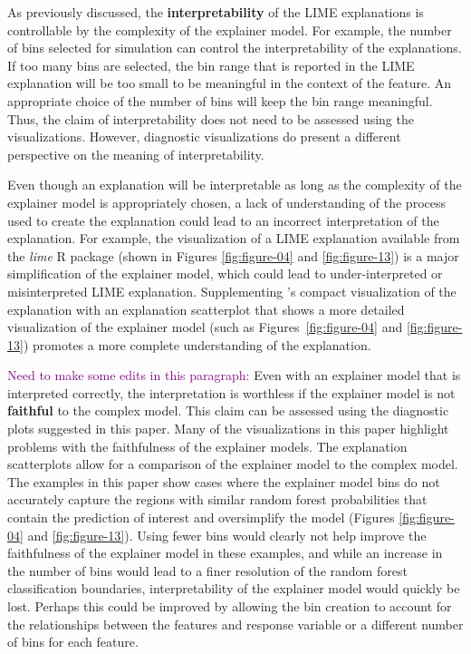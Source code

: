 \documentclass[AMS,STIX2COL]{WileyNJD-v2}\usepackage[]{graphicx}\usepackage[]{color}
\newcommand{\kgc}[1]{\textcolor{purple}{#1}}
\begin{document}
As previously discussed, the \textbf{interpretability} of the LIME explanations is controllable  by the complexity of the explainer model. For example, the number of bins selected for simulation can control the interpretability of the explanations. If too many bins are selected, the bin range that is reported in the LIME explanation will be too small to be meaningful in the context of the feature. An appropriate choice of the number of bins will keep the bin range meaningful. Thus, the claim of interpretability does not need to be assessed using the visualizations. However, diagnostic visualizations do present a different perspective on the meaning of interpretability.

Even though an explanation will be interpretable as long as the complexity of the explainer model is appropriately chosen, a lack of understanding of the process used to create the explanation could lead to an incorrect interpretation of the explanation. For example, the visualization of a LIME explanation available from the \emph{lime} R package \citep{pedersen:2020} (shown in Figures \ref{fig:figure-04} and \ref{fig:figure-13}) is a major simplification of the explainer model, which could lead to under-interpreted or misinterpreted LIME explanation. Supplementing \citet{pedersen:2020}'s compact visualization of the explanation with an explanation scatterplot that shows a more detailed visualization of the explainer model (such as Figures~\ref{fig:figure-04} and \ref{fig:figure-13}) promotes a more complete understanding of the explanation.

\kgc{Need to make some edits in this paragraph:} Even with an explainer model that is interpreted correctly, the interpretation is worthless if the explainer model is not \textbf{faithful} to the complex model. This claim can be assessed using the diagnostic plots suggested in this paper. Many of the visualizations in this paper highlight problems with the faithfulness of the explainer models. The explanation scatterplots allow for a comparison of the explainer model to the complex model. The examples in this paper show cases where the explainer model bins do not accurately capture the regions with similar random forest probabilities that contain the prediction of interest and oversimplify the model (Figures \ref{fig:figure-04} and \ref{fig:figure-13}). Using fewer bins would clearly not help improve the faithfulness of the explainer model in these examples, and while an increase in the number of bins would lead to a finer resolution of the random forest classification boundaries, interpretability of the explainer model would quickly be lost. Perhaps this could be improved by allowing the bin creation to account for the relationships between the features and response variable or a different number of bins for each feature.
\end{document}
